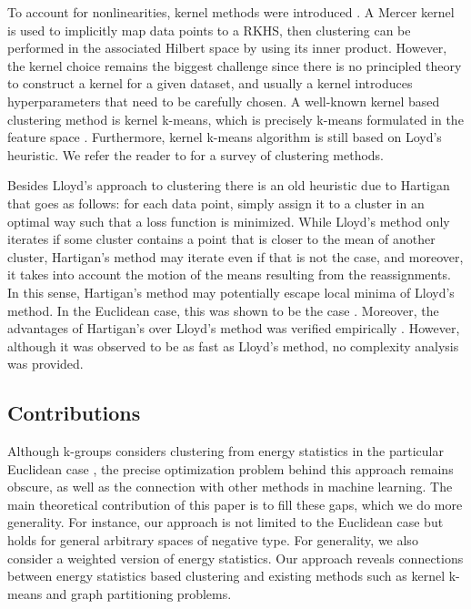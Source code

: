 \documentclass[10pt,journal,compsoc]{IEEEtran}
\begin{document}
To account for nonlinearities, kernel methods were introduced 
\cite{Smola,Girolami}. A Mercer kernel \cite{Mercer} is used to implicitly
map data points to a RKHS, then clustering can be performed in the associated
Hilbert space by using its inner product. However, the kernel choice remains 
the biggest challenge since there is no principled theory to construct a kernel
for a given dataset, and usually a kernel introduces hyperparameters that 
need to be carefully chosen. A well-known kernel based clustering method
is kernel k-means, which is precisely k-means 
formulated in the feature space \cite{Girolami}. 
Furthermore, kernel k-means algorithm
\cite{Dhillon2,Dhillon} is still based on Loyd's heuristic.
We refer the reader to \cite{Filippone} for a survey of clustering
methods.

Besides Lloyd's approach to clustering %
there is an old heuristic
due to Hartigan \cite{Hartigan1975,Hartigan1979} that
goes as follows: for each data point, simply assign it to a cluster
in an optimal way such that a loss function is minimized.
While Lloyd's method only iterates if some cluster contains a point
that is closer to the mean of another cluster, Hartigan's method may iterate
even if that is not the case, and moreover, it takes into account the motion
of the means resulting from the reassignments. In this sense, Hartigan's
method may potentially escape local minima of Lloyd's method.
In the Euclidean case, this was shown to be the case \cite{Telgarsky}.
Moreover, the advantages of Hartigan's over Lloyd's method was verified
empirically \cite{Telgarsky,Slonin}. However, 
although it was observed to be as fast as Lloyd's method, no complexity
analysis was provided. 


\subsection*{Contributions}
Although k-groups considers clustering from energy statistics
in the particular Euclidean case \cite{Kgroups},
the precise optimization problem behind this approach
remains obscure, as well as the connection with other methods
in machine learning.
The main theoretical contribution of this paper is to fill these gaps, 
which 
we do   more generality. For instance, our approach is not limited
to the Euclidean case but holds for general arbitrary spaces
of negative type. 
For generality, we also
consider a weighted version of energy statistics.
Our approach reveals connections
between energy statistics based clustering and existing methods
such as kernel k-means and graph partitioning problems.
\end{document}
